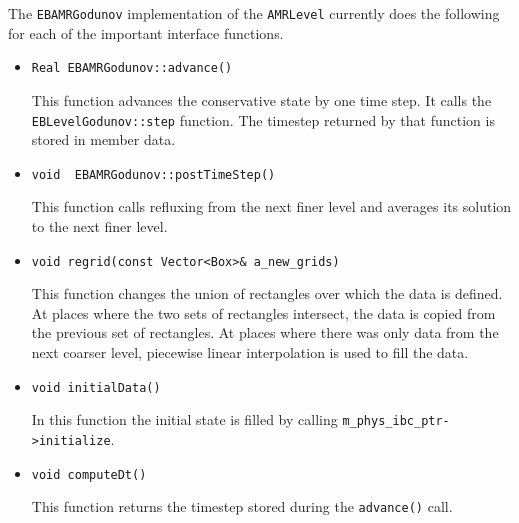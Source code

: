 The {\tt EBAMRGodunov} implementation of the {\tt AMRLevel}
currently does the following for each of the important interface
functions.
\begin{itemize}
\item \begin{small} \begin{verbatim}
Real EBAMRGodunov::advance()
\end{verbatim}\end{small}
This function advances the conservative state by one time step.  It
calls the {\tt EBLevelGodunov::step} function.  The timestep
returned by that function is stored in member data.

\item \begin{small} \begin{verbatim}
void  EBAMRGodunov::postTimeStep()
\end{verbatim}\end{small}
This function calls refluxing from the next finer level and
averages its solution to the next finer level.  

\item \begin{small} \begin{verbatim}
void regrid(const Vector<Box>& a_new_grids)
\end{verbatim}\end{small}
This function changes the union of rectangles over
which the data is defined.  At places where the two
sets of rectangles intersect, the data is copied from
the previous set of rectangles.  At places where there
was only data from the next coarser level, piecewise
linear interpolation is used to fill the data.

\item \begin{small} \begin{verbatim}
void initialData()
\end{verbatim}\end{small}
In this function the initial state is filled by
calling \verb/m_phys_ibc_ptr->initialize/.    

\item \begin{small} \begin{verbatim}
void computeDt()
\end{verbatim}\end{small}
This  function returns the timestep stored during
the \verb/advance()/ call.


\end{itemize}
